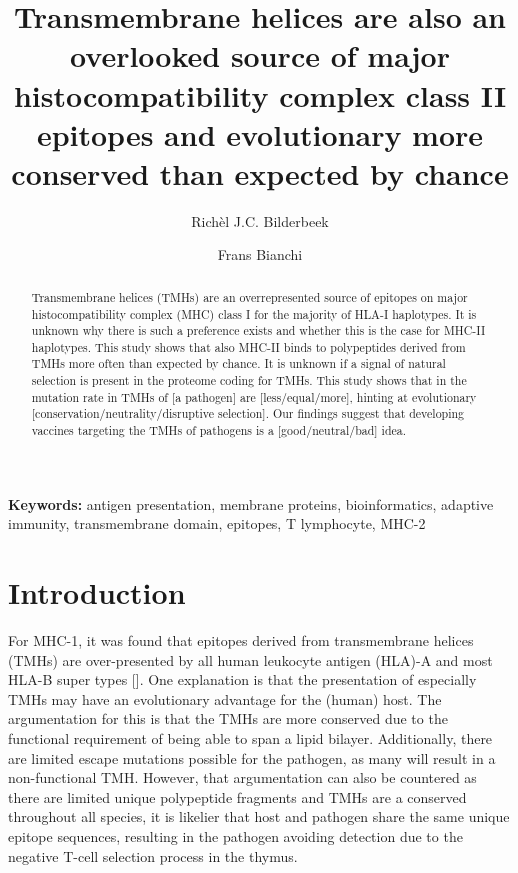 \documentclass{article}
\title{
  Transmembrane helices are also 
  an overlooked source of major histocompatibility complex class II epitopes
  and evolutionary more conserved than expected by chance
}
\author[1]{Rich\`el J.C. Bilderbeek}
\author[2]{Frans Bianchi}
\affil[1]{Groningen Institute for Evolutionary Life Sciences, University of 
Groningen, Groningen, The Netherlands}
\affil[2]{Frans' Institute, University of Groningen, Groningen, The Netherlands}
\begin{document}
\maketitle

\begin{abstract}

Transmembrane helices (TMHs) are an overrepresented source of epitopes on major 
histocompatibility complex (MHC) class I for the majority of HLA-I haplotypes. 
It is unknown why there is such a preference exists and 
whether this is the case for MHC-II haplotypes. 
This study shows that also MHC-II binds to polypeptides derived from TMHs 
more often than expected by chance. It is unknown if a signal of
natural selection is present in the proteome coding for TMHs.
This study shows that in the mutation rate in TMHs of [a pathogen] 
are [less/equal/more], hinting at 
evolutionary [conservation/neutrality/disruptive selection].
Our findings suggest that developing vaccines targeting the TMHs of
pathogens is a [good/neutral/bad] idea.

\end{abstract}

{\bf Keywords:} antigen presentation, membrane proteins, bioinformatics, 
adaptive immunity, transmembrane domain, epitopes, T lymphocyte, MHC-2

\section{Introduction}

For MHC-1, it was found that epitopes derived from transmembrane helices (TMHs)
are over-presented by all human leukocyte antigen (HLA)-A and most HLA-B super 
types [\cite{bianchi2017transmembrane}]. One explanation is that the 
presentation of especially TMHs may have an evolutionary advantage for 
the (human) host. The argumentation for this is that the TMHs are more 
conserved due to the functional requirement of being able to span a lipid 
bilayer. Additionally, there are limited escape mutations possible for the 
pathogen, as many will result in a non-functional TMH. 
However, that argumentation can also be countered as there are limited unique 
polypeptide fragments and TMHs are a conserved throughout all species, it is 
likelier that host and pathogen share the same unique epitope sequences, 
resulting in the pathogen avoiding detection due to the negative T-cell 
selection process in the thymus.  
\end{document}
